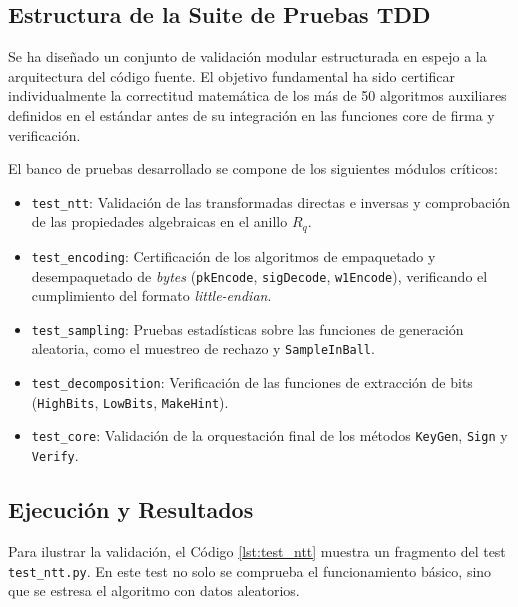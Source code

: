 \documentclass[11pt, a4paper]{report}
\theoremstyle{definition}
\begin{document}
\subsection{Estructura de la Suite de Pruebas TDD}

Se ha diseñado un conjunto de validación modular estructurada en espejo a la arquitectura del código fuente. El objetivo fundamental ha sido certificar individualmente la correctitud matemática de los más de 50 algoritmos auxiliares definidos en el estándar antes de su integración en las funciones core de firma y verificación.

El banco de pruebas desarrollado se compone de los siguientes módulos críticos:
\begin{itemize}
    \item \texttt{test\_ntt}: Validación de las transformadas directas e inversas y comprobación de las propiedades algebraicas en el anillo $R_q$.
    \item \texttt{test\_encoding}: Certificación de los algoritmos de empaquetado y desempaquetado de \textit{bytes} (\texttt{pkEncode}, \texttt{sigDecode}, \texttt{w1Encode}), verificando el cumplimiento del formato \textit{little-endian}.
    \item \texttt{test\_sampling}: Pruebas estadísticas sobre las funciones de generación aleatoria, como el muestreo de rechazo y \texttt{SampleInBall}.
    \item \texttt{test\_decomposition}: Verificación de las funciones de extracción de bits (\texttt{HighBits}, \texttt{LowBits}, \texttt{MakeHint}).
    \item \texttt{test\_core}: Validación de la orquestación final de los métodos \texttt{KeyGen}, \texttt{Sign} y \texttt{Verify}.
\end{itemize}

\subsection{Ejecución y Resultados}

Para ilustrar la validación, el Código \ref{lst:test_ntt} muestra un fragmento del test \texttt{test\_ntt.py}. En este test no solo se comprueba el funcionamiento básico, sino que se estresa el algoritmo con datos aleatorios.
\end{document}
